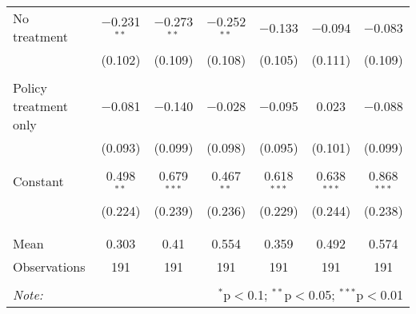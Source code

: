 \begin{tabular}{@{\extracolsep{5pt}}lcccccc}
 No treatment & $-$0.231$^{**}$ & $-$0.273$^{**}$ & $-$0.252$^{**}$ & $-$0.133 & $-$0.094 & $-$0.083 \\ 
  & (0.102) & (0.109) & (0.108) & (0.105) & (0.111) & (0.109) \\ 
  & & & & & & \\ 
 Policy treatment only & $-$0.081 & $-$0.140 & $-$0.028 & $-$0.095 & 0.023 & $-$0.088 \\ 
  & (0.093) & (0.099) & (0.098) & (0.095) & (0.101) & (0.099) \\ 
  & & & & & & \\ 
 Constant & 0.498$^{**}$ & 0.679$^{***}$ & 0.467$^{**}$ & 0.618$^{***}$ & 0.638$^{***}$ & 0.868$^{***}$ \\ 
  & (0.224) & (0.239) & (0.236) & (0.229) & (0.244) & (0.238) \\ 
  & & & & & & \\ 
\hline \\[-1.8ex] 
Mean & 0.303 & 0.41 & 0.554 & 0.359 & 0.492 & 0.574 \\ 
Observations & 191 & 191 & 191 & 191 & 191 & 191 \\ 
\hline 
\hline \\[-1.8ex] 
\textit{Note:}  & \multicolumn{6}{r}{$^{*}$p$<$0.1; $^{**}$p$<$0.05; $^{***}$p$<$0.01} \\ 
\end{tabular} 
